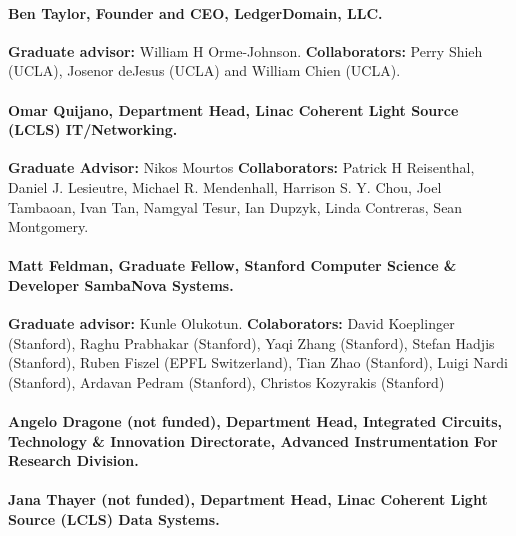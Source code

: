 \documentclass{article}
\begin{document}
\paragraph{Ben Taylor, Founder and CEO, LedgerDomain, LLC.  }
\textbf{Graduate advisor: } William H Orme-Johnson.
\textbf{Collaborators: }
Perry Shieh (UCLA), Josenor deJesus (UCLA) and William Chien (UCLA).

\paragraph{Omar Quijano, Department Head, Linac Coherent Light Source (LCLS) IT/Networking. }
\textbf{Graduate Advisor: } Nikos Mourtos
\textbf{Collaborators: }
Patrick H Reisenthal, Daniel J. Lesieutre, Michael R. Mendenhall, Harrison S. Y. Chou, Joel Tambaoan, Ivan Tan, Namgyal Tesur, Ian Dupzyk, Linda Contreras, Sean Montgomery.

\paragraph{Matt Feldman, Graduate Fellow, Stanford Computer Science \& Developer SambaNova Systems. }
\textbf{Graduate advisor: } Kunle Olukotun.
\textbf{Colaborators: }
David Koeplinger (Stanford), Raghu Prabhakar (Stanford), Yaqi Zhang (Stanford), Stefan Hadjis (Stanford), Ruben Fiszel (EPFL Switzerland), Tian Zhao (Stanford), Luigi Nardi (Stanford), Ardavan Pedram (Stanford), Christos Kozyrakis (Stanford)

\paragraph{Angelo Dragone (not funded), Department Head, Integrated Circuits, Technology \& Innovation Directorate, Advanced Instrumentation For Research Division. }

\paragraph{Jana Thayer (not funded), Department Head, Linac Coherent Light Source (LCLS) Data Systems. }


\end{document}
